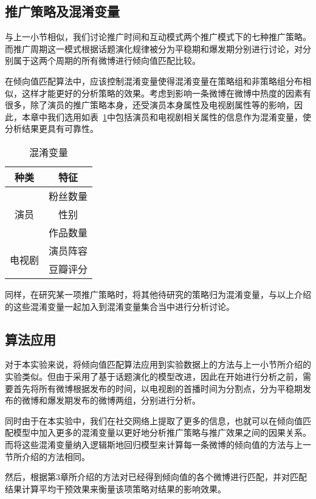 \subsection{推广策略及混淆变量}

与上一小节相似，我们讨论推广时间和互动模式两个推广模式下的七种推广策略。而推广周期这一模式根据话题演化规律被分为平稳期和爆发期分别进行讨论，对分别属于这两个周期的所有微博进行倾向值匹配比较。

在倾向值匹配算法中，应该控制混淆变量使得混淆变量在策略组和非策略组分布相似，这样才能更好的分析策略的效果。考虑到影响一条微博在微博中热度的因素有很多，除了演员的推广策略本身，还受演员本身属性及电视剧属性等的影响，因此，本章中我们选用如表~\ref{mul}中包括演员和电视剧相关属性的信息作为混淆变量，使分析结果更具有可靠性。

\begin{table}[!htbp]
\centering
\caption{混淆变量}
\label{mul}
\begin{tabular}{|c|c|} \hline
种类 & 特征\\ \hline
\multirow{3}{*}{演员} & 粉丝数量\\%
& 性别\\%
& 作品数量\\ \hline
\multirow{2}{*}{电视剧} & 演员阵容\\%
&豆瓣评分 \\ \hline
\end{tabular}
\end{table}

同样，在研究某一项推广策略时，将其他待研究的策略归为混淆变量，与以上介绍的这些混淆变量一起加入到混淆变量集合当中进行分析讨论。

\subsection{算法应用}

对于本实验来说，将倾向值匹配算法应用到实验数据上的方法与上一小节所介绍的实验类似。但由于采用了基于话题演化的模型改进，因此在开始进行分析之前，需要首先将所有微博根据发布的时间，以电视剧的首播时间为分割点，分为平稳期发布的微博和爆发期发布的微博两组，分别进行分析。

同时由于在本实验中，我们在社交网络上提取了更多的信息，也就可以在倾向值匹配模型中加入更多的混淆变量以更好地分析推广策略与推广效果之间的因果关系。而将这些混淆变量纳入逻辑斯地回归模型来计算每一条微博的倾向值的方法与上一节所介绍的方法相同。

然后，根据第3章所介绍的方法对已经得到倾向值的各个微博进行匹配，并对匹配结果计算平均干预效果来衡量该项策略对结果的影响效果。

